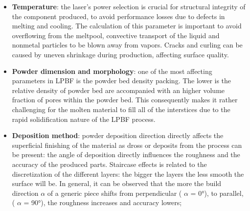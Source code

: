 \begin{itemize}
    \item \textbf{Temperature}: the laser's power selection is crucial for structural integrity of the component produced, to avoid performance losses due to defects in melting and cooling. The calculation of this parameter is important to avoid overflowing from the meltpool, convective transport of the liquid and nonmetal particles to be blown away from vapors. Cracks and curling can be caused by uneven shrinkage during production, affecting surface quality. 
    \item  \textbf{Powder dimension and morphology}: one of the most affecting parameters in LPBF is the powder bed density packing. The lower is the relative density of powder bed are accompanied with an higher volume fraction of pores within the powder bed. This consequently makes it rather challenging for the molten material to fill all of the interstices due to the rapid solidification nature of the LPBF process.
    \item  \textbf{Deposition method}: powder deposition direction directly affects the superficial finishing of the material as dross or deposits from the process can be present: the angle of deposition directly influences the roughness and the accuracy of the produced parts. Staircase effects is related to the discretization of the different layers: the bigger the layers the less smooth the surface will be. In general, it can be observed that the more the build direction $\alpha$ of a generic piece shifts from perpendicular ( $\alpha$ = 0°), to parallel, ( $\alpha$ = 90°), the roughness increases and accuracy lowers\cite{tesi_dottorato};
\end{itemize}




